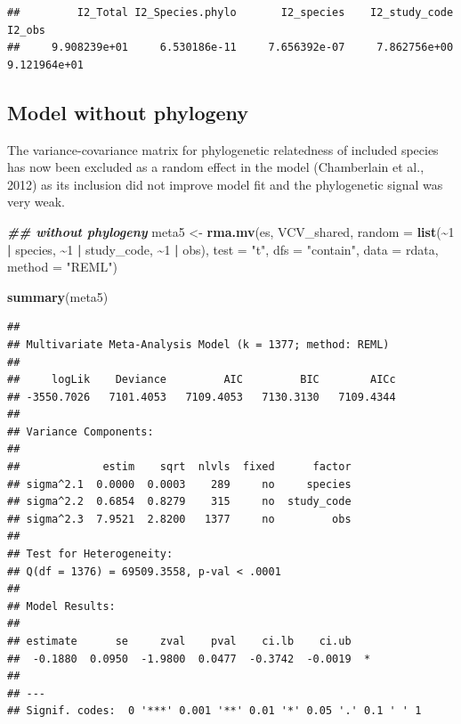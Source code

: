 \documentclass[
]{article}
\newenvironment{Shaded}{\begin{snugshade}}{\end{snugshade}}
\newcommand{\AttributeTok}[1]{\textcolor[rgb]{0.13,0.29,0.53}{#1}}
\newcommand{\DecValTok}[1]{\textcolor[rgb]{0.00,0.00,0.81}{#1}}
\newcommand{\DocumentationTok}[1]{\textcolor[rgb]{0.56,0.35,0.01}{\textbf{\textit{#1}}}}
\newcommand{\FunctionTok}[1]{\textcolor[rgb]{0.13,0.29,0.53}{\textbf{#1}}}
\newcommand{\NormalTok}[1]{#1}
\newcommand{\OtherTok}[1]{\textcolor[rgb]{0.56,0.35,0.01}{#1}}
\newcommand{\SpecialCharTok}[1]{\textcolor[rgb]{0.81,0.36,0.00}{\textbf{#1}}}
\newcommand{\StringTok}[1]{\textcolor[rgb]{0.31,0.60,0.02}{#1}}
\begin{document}
\begin{verbatim}
##         I2_Total I2_Species.phylo       I2_species    I2_study_code           I2_obs 
##     9.908239e+01     6.530186e-11     7.656392e-07     7.862756e+00     9.121964e+01
\end{verbatim}

\newpage

\hypertarget{model-without-phylogeny}{%
\subsection{Model without phylogeny}\label{model-without-phylogeny}}

The variance-covariance matrix for phylogenetic relatedness of included
species has now been excluded as a random effect in the model
(Chamberlain et al., 2012) as its inclusion did not improve model fit
and the phylogenetic signal was very weak.

\begin{Shaded}
\begin{Highlighting}[]
\DocumentationTok{\#\# without phylogeny}
\NormalTok{meta5 }\OtherTok{\textless{}{-}} \FunctionTok{rma.mv}\NormalTok{(es, VCV\_shared, }\AttributeTok{random =} \FunctionTok{list}\NormalTok{(}\SpecialCharTok{\textasciitilde{}}\DecValTok{1} \SpecialCharTok{|}\NormalTok{ species, }\SpecialCharTok{\textasciitilde{}}\DecValTok{1} \SpecialCharTok{|}
\NormalTok{    study\_code, }\SpecialCharTok{\textasciitilde{}}\DecValTok{1} \SpecialCharTok{|}\NormalTok{ obs), }\AttributeTok{test =} \StringTok{"t"}\NormalTok{, }\AttributeTok{dfs =} \StringTok{"contain"}\NormalTok{, }\AttributeTok{data =}\NormalTok{ rdata,}
    \AttributeTok{method =} \StringTok{"REML"}\NormalTok{)}
\end{Highlighting}
\end{Shaded}

\begin{Shaded}
\begin{Highlighting}[]
\FunctionTok{summary}\NormalTok{(meta5)}
\end{Highlighting}
\end{Shaded}

\begin{verbatim}
## 
## Multivariate Meta-Analysis Model (k = 1377; method: REML)
## 
##     logLik    Deviance         AIC         BIC        AICc   
## -3550.7026   7101.4053   7109.4053   7130.3130   7109.4344   
## 
## Variance Components:
## 
##             estim    sqrt  nlvls  fixed      factor 
## sigma^2.1  0.0000  0.0003    289     no     species 
## sigma^2.2  0.6854  0.8279    315     no  study_code 
## sigma^2.3  7.9521  2.8200   1377     no         obs 
## 
## Test for Heterogeneity:
## Q(df = 1376) = 69509.3558, p-val < .0001
## 
## Model Results:
## 
## estimate      se     zval    pval    ci.lb    ci.ub    
##  -0.1880  0.0950  -1.9800  0.0477  -0.3742  -0.0019  * 
## 
## ---
## Signif. codes:  0 '***' 0.001 '**' 0.01 '*' 0.05 '.' 0.1 ' ' 1
\end{verbatim}
\end{document}
